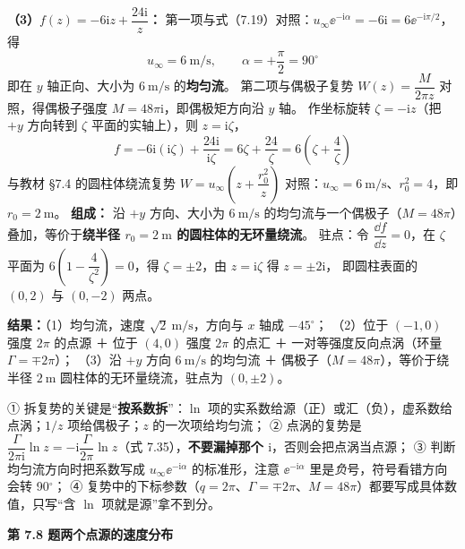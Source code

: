 \begin{jie}
\textbf{（3）$f(z)=-6\mathrm{i} z+\dfrac{24\mathrm{i}}{z}$：}
第一项与式（7.19）对照：$u_\infty\ee^{-\mathrm{i}\alpha}=-6\mathrm{i}=6\ee^{-\mathrm{i}\pi/2}$，得
\[
u_\infty=6\ \mathrm{m/s},\qquad \alpha=+\frac{\pi}{2}=90^\circ
\]
即在 $y$ 轴正向、大小为 $6\ \mathrm{m/s}$ 的\textbf{均匀流}。
第二项与偶极子复势 $W(z)=\dfrac{M}{2\pi z}$ 对照，得偶极子强度 $M=48\pi\mathrm{i}$，即偶极矩方向沿 $y$ 轴。
作坐标旋转 $\zeta=-\mathrm{i} z$（把 $+y$ 方向转到 $\zeta$ 平面的实轴上），则 $z=\mathrm{i}\zeta$，
\[
f=-6\mathrm{i}(\mathrm{i}\zeta)+\frac{24\mathrm{i}}{\mathrm{i}\zeta}=6\zeta+\frac{24}{\zeta}=6\left(\zeta+\frac{4}{\zeta}\right)
\]
与教材 \S7.4 的圆柱体绕流复势 $W=u_\infty\left(z+\dfrac{r_0^2}{z}\right)$ 对照：$u_\infty=6\ \mathrm{m/s}$、$r_0^2=4$，即 $r_0=2\ \mathrm{m}$。
\textbf{组成：} 沿 $+y$ 方向、大小为 $6\ \mathrm{m/s}$ 的均匀流与一个偶极子（$M=48\pi$）叠加，等价于\textbf{绕半径 $r_0=2\ \mathrm{m}$ 的圆柱体的无环量绕流}。
驻点：令 $\dfrac{\dd f}{\dd z}=0$，在 $\zeta$ 平面为 $6\left(1-\dfrac{4}{\zeta^2}\right)=0$，得 $\zeta=\pm 2$，由 $z=\mathrm{i}\zeta$ 得 $z=\pm 2\mathrm{i}$，
即圆柱表面的 $(0,2)$ 与 $(0,-2)$ 两点。

\textbf{结果：}（1）均匀流，速度 $\sqrt{2}\ \mathrm{m/s}$，方向与 $x$ 轴成 $-45^\circ$；
（2）位于 $(-1,0)$ 强度 $2\pi$ 的点源 ＋ 位于 $(4,0)$ 强度 $2\pi$ 的点汇 ＋ 一对等强度反向点涡（环量 $\Gamma=\mp 2\pi$）；
（3）沿 $+y$ 方向 $6\ \mathrm{m/s}$ 的均匀流 ＋ 偶极子（$M=48\pi$），等价于绕半径 $2\ \mathrm{m}$ 圆柱体的无环量绕流，驻点为 $(0,\pm 2)$。
\end{jie}

\begin{yicuo}
① 拆复势的关键是“\textbf{按系数拆}”：$\ln$ 项的实系数给源（正）或汇（负），虚系数给点涡；$1/z$ 项给偶极子；$z$ 的一次项给均匀流；
② 点涡的复势是 $\dfrac{\Gamma}{2\pi\mathrm{i}}\ln z=-\mathrm{i}\dfrac{\Gamma}{2\pi}\ln z$（式 7.35），\textbf{不要漏掉那个 $\mathrm{i}$}，否则会把点涡当点源；
③ 判断均匀流方向时把系数写成 $u_\infty\ee^{-\mathrm{i}\alpha}$ 的标准形，注意 $\ee^{-\mathrm{i}\alpha}$ 里是\emph{负}号，符号看错方向会转 90$^\circ$；
④ 复势中的下标参数（$q=2\pi$、$\Gamma=\mp2\pi$、$M=48\pi$）都要写成具体数值，只写“含 $\ln$ 项就是源”拿不到分。
\end{yicuo}

\noindent\textbf{第 7.8 题\quad 两个点源的速度分布}


